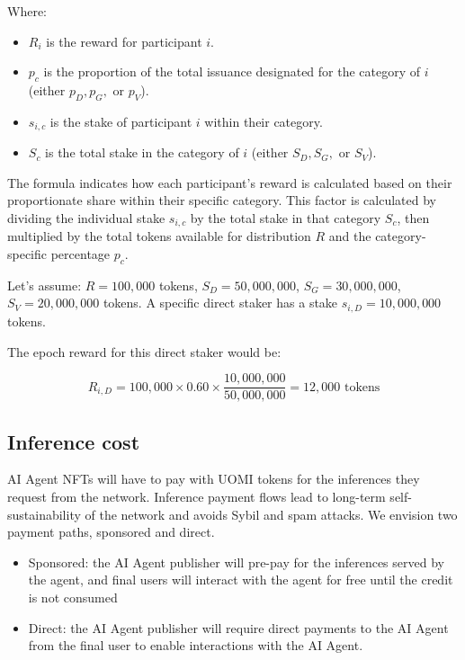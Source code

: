 \documentclass{article}
\begin{document}
Where:
\begin{itemize}
\item \( R_i \) is the reward for participant \( i \).
\item \( p_c \) is the proportion of the total issuance designated for the category of \( i \) (either \( p_D, p_G, \) or \( p_V \)).
\item \( s_{i,c} \) is the stake of participant \( i \) within their category.
\item \( S_c \) is the total stake in the category of \( i \) (either \( S_D, S_G, \) or \( S_V \)).
\end{itemize}
The formula indicates how each participant's reward is calculated based on their proportionate share within their specific category. This factor is calculated by dividing the individual stake \( s_{i,c} \) by the total stake in that category \( S_c \), then multiplied by the total tokens available for distribution \( R \) and the category-specific percentage \( p_c \).

Let's assume: \( R = 100,000 \) tokens, \( S_D = 50,000,000 \), \( S_G = 30,000,000 \), \( S_V = 20,000,000 \) tokens. A specific direct staker has a stake \( s_{i,D} = 10,000,000 \) tokens.

The epoch reward for this direct staker would be:

\[ R_{i,D} = 100,000 \times 0.60 \times \frac{10,000,000}{50,000,000} = 12,000 \text{ tokens} \]

\subsection{Inference cost}

AI Agent NFTs will have to pay with UOMI tokens for the inferences they request from the network. Inference payment flows lead to long-term self-sustainability of the network and avoids Sybil and spam attacks. We envision two payment paths, sponsored and direct.

\begin{itemize}
\item Sponsored: the AI Agent publisher will pre-pay for the inferences served by the agent, and final users will interact with the agent for free until the credit is not consumed

\item Direct:  the AI Agent publisher will require direct payments to the AI Agent from the final user to enable interactions with the AI Agent.

\end{itemize}
\end{document}
